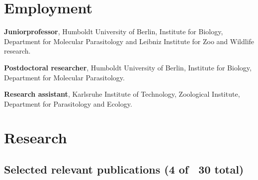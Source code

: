 \documentclass[10pt,a4paper]{article}
\renewenvironment{itemize}{
  \begin{list}{}{
    \setlength{\leftmargin}{2.5em}
    \setlength{\itemsep}{0.25em}
    \setlength{\parskip}{0pt}
    \setlength{\parsep}{0.25em}
  }
}{
  \end{list}
}
\begin{document}
\section*{Employment}

\begin{itemize}
\item [2014 -- present] \textbf{Juniorprofessor}, Humboldt
  University of Berlin, Institute for Biology, Department for
  Molecular Parasitology and Leibniz Institute for Zoo and Wildlife
  research.
\item [2012 -- 2014] \textbf{Postdoctoral researcher},
  Humboldt University of Berlin, Institute for Biology, Department for
  Molecular Parasitology.
\item [2008 -- 2011] \textbf{Research assistant}, Karlsruhe
  Institute of Technology, Zoological Institute, Department for
  Parasitology and Ecology.
\end{itemize}



\section*{Research}

\subsection*{Selected relevant publications (4 of ~30 total)}
\end{document}
